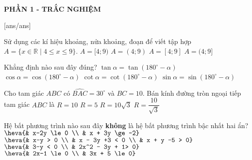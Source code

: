 
\begin{center}
	\textbf{PHẦN 1 - TRẮC NGHIỆM}
\end{center}
[ans/ans]
\begin{ex}%
	Sử dụng các kí hiệu khoảng, nửa khoảng, đoạn để viết tập hợp $A = \{x \in \mathbb{R} \mid 4 \le x \le 9 \}$.
	\choice
	{$A = [4;9)$}
	{$A = (4;9)$}
	{\True $A = [4;9]$}
	{$A = (4;9]$}
\end{ex}
\begin{ex}%
	Khẳng định nào sau đây đúng?
	\choice
	{$\tan \alpha = \tan (180^\circ - \alpha)$}
	{$\cos \alpha = \cos (180^\circ - \alpha)$}
	{$\cot \alpha = \cot (180^\circ - \alpha)$}
	{\True $\sin\alpha = \sin (180^\circ - \alpha)$}
\end{ex}
\begin{ex}%
	Cho tam giác $ABC$ có $\widehat{BAC} = 30^\circ$ và $BC = 10$. Bán kính đường tròn ngoại tiếp tam giác $ABC$ là
	\choice
	{\True $R = 10$}
	{$R = 5$}
	{$R = 10\sqrt{3}$}
	{$R = \dfrac{10}{\sqrt{3}}$}
\end{ex}
\begin{ex}%
	Hệ bất phương trình nào sau đây \textbf{không} là hệ bất phương trình bậc nhất hai ẩn?
	\choice
	{$\heva{& x-2y \le 0 \\ & x + 3y \ge -2}$}
	{$\heva{& x-y > 0 \\ & x - 3y +3 < 0 \\ & x + y -5 > 0}$}
	{\True $\heva{& 3-y < 0 \\ & 2x^2 - 3y + 1> 0}$}
	{$\heva{& 2x-1 \le 0 \\ & 3x + 5 \le 0}$}
\end{ex}


